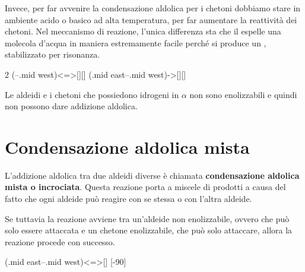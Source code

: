 Invece, per far avvenire la condensazione aldolica per i chetoni dobbiamo stare in ambiente acido o basico ad alta temperatura, per far aumentare la reattività dei chetoni. Nel meccanismo di reazione, l'unica differenza sta che il  espelle una molecola d'acqua in maniera estremamente facile perché si produce un , stabilizzato per risonanza.


\begin{reaction}
	2 
	\arrow(--.mid west){<=>[][]}
	\arrow(.mid east--.mid west){->[][]}
\end{reaction}

Le aldeidi e i chetoni che possiedono idrogeni in \(\alpha\) non sono enolizzabili e quindi non possono dare addizione aldolica.


\section{Condensazione aldolica mista}
L'addizione aldolica tra due aldeidi diverse è chiamata \textbf{condensazione aldolica mista o incrociata}. Questa reazione porta a miscele di prodotti a causa del fatto che ogni aldeide può reagire con se stessa o con l'altra aldeide.

Se tuttavia la reazione avviene tra un'aldeide non enolizzabile, ovvero che può solo essere attaccata e un chetone enolizzabile, che può solo attaccare, allora la reazione procede con successo.

\begin{reaction}
	\+
	\arrow(.mid east--.mid west){<=>[]}
	\arrow{->[*{0}calore][*{0}$-$ \ch{H2O}]}[-90]
\end{reaction}



